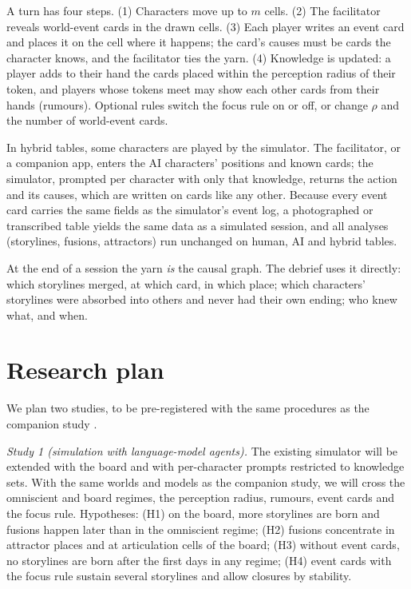 \documentclass[11pt]{article}
\begin{document}
A turn has four steps. (1) Characters move up to $m$ cells. (2) The
facilitator reveals world-event cards in the drawn cells. (3) Each player
writes an event card and places it on the cell where it happens; the card's
causes must be cards the character knows, and the facilitator ties the yarn.
(4) Knowledge is updated: a player adds to their hand the cards placed within
the perception radius of their token, and players whose tokens meet may show
each other cards from their hands (rumours). Optional rules switch the focus
rule on or off, or change $\rho$ and the number of world-event cards.

In hybrid tables, some characters are played by the simulator. The
facilitator, or a companion app, enters the AI characters' positions and
known cards; the simulator, prompted per character with only that
knowledge, returns the action and its causes, which are written on cards
like any other. Because every event card carries the same fields as the
simulator's event log, a photographed or transcribed table yields the same
data as a simulated session, and all analyses (storylines, fusions,
attractors) run unchanged on human, AI and hybrid tables.

At the end of a session the yarn \emph{is} the causal graph. The debrief uses
it directly: which storylines merged, at which card, in which place; which
characters' storylines were absorbed into others and never had their own
ending; who knew what, and when.

\section{Research plan}

We plan two studies, to be pre-registered with the same procedures as the
companion study \parencite{nosek2018}.

\emph{Study 1 (simulation with language-model agents).} The existing
simulator will be extended with the board and with per-character prompts
restricted to knowledge sets. With the same worlds and models as the
companion study, we will cross the omniscient and board regimes, the
perception radius, rumours, event cards and the focus rule. Hypotheses:
(H1) on the board, more storylines are born and fusions happen later than in
the omniscient regime; (H2) fusions concentrate in attractor places and at
articulation cells of the board; (H3) without event cards, no storylines are
born after the first days in any regime; (H4) event cards with the focus rule
sustain several storylines and allow closures by stability.
\end{document}
